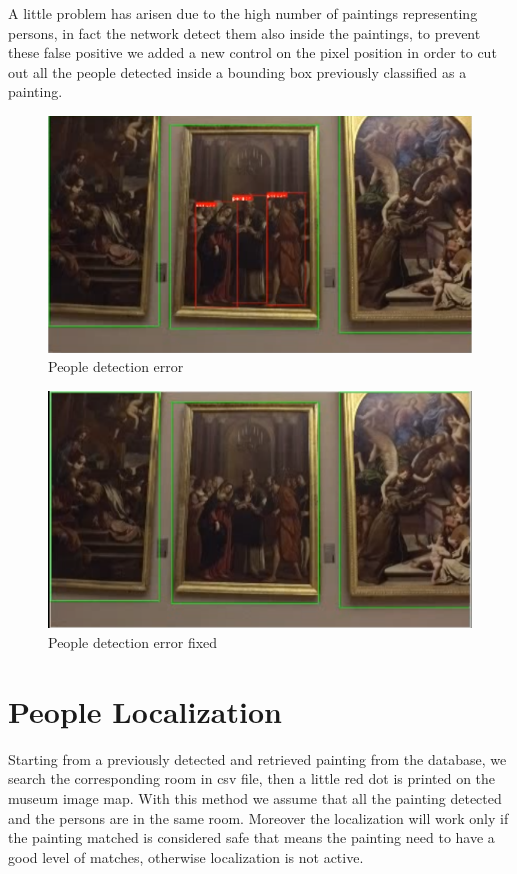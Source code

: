 \documentclass[conference]{IEEEtran}
\begin{document}
A little problem has arisen due to the high number of paintings representing persons, in fact the network detect them also inside the paintings, to prevent these false positive we added a new control on the pixel position in order to cut out all the people detected inside a bounding box previously classified as a painting.

\begin{figure}[htbp]
\centerline{\includegraphics[width=0.8\columnwidth]{../people_detection/people_error.png}}
\caption{People detection error}
\label{fig_People_detection_error}
\end{figure}

\begin{figure}[htbp]
\centerline{\includegraphics[width=0.8\columnwidth]{../people_detection/people_error_fixed.png}}
\caption{People detection error fixed}
\label{fig_People_detection_error_fixed}
\end{figure}

\section{People Localization}
Starting from a previously detected and retrieved painting from the database, we search the corresponding room in csv file, then a little red dot is printed on the museum image map. With this method we assume that all the painting detected and the persons are in the same room.
Moreover the localization will work only if the painting matched is considered safe that means the painting need to have a good level of matches, otherwise localization is not active.\\
\end{document}
